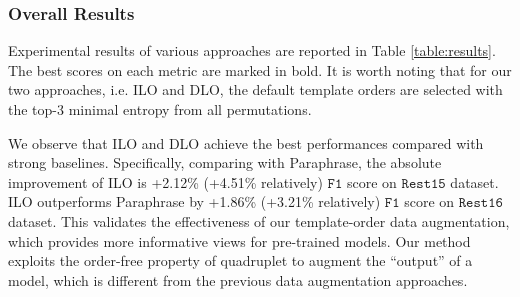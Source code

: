 \documentclass[11pt]{article}
\begin{document}
\begin{table}[]
\small
    \centering
    \caption{Evaluation results of ablation study.}
    \label{table:results_ablation}
\end{table}

\subsubsection{Overall Results}
Experimental results of various approaches are reported in Table \ref{table:results}. The best scores on each metric are marked in bold. It is worth noting that for our two approaches, i.e. ILO and DLO, the default template orders are selected with the top-3 minimal entropy from all permutations. 

We observe that ILO and DLO achieve the best performances compared with strong baselines. Specifically, comparing with Paraphrase, the absolute improvement of ILO is +2.12\% (+4.51\% relatively) $\mathtt{F1}$ score on $\mathtt{Rest15}$ dataset. ILO outperforms Paraphrase by +1.86\% (+3.21\% relatively) $\mathtt{F1}$ score on $\mathtt{Rest16}$ dataset. This validates the effectiveness of our template-order data augmentation, which provides more informative views for pre-trained models. Our method exploits the order-free property of quadruplet to augment the ``output'' of a model, which is different from the previous data augmentation approaches. 
\end{document}
